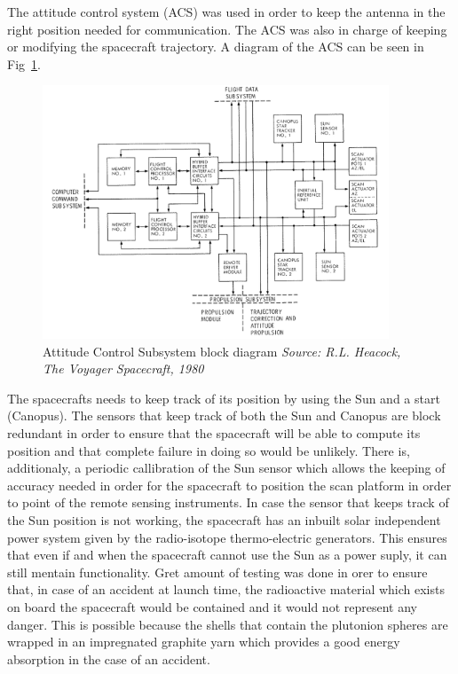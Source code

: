 The attitude control system (ACS) was used in order to keep
the antenna in the right position needed for communication. The ACS was also
in charge of keeping or modifying the spacecraft trajectory. A diagram of the
ACS can be seen in Fig~\ref{fig:voyager_bd}.

\begin{figure}[htb]
	\begin{center}
	\includegraphics[width=0.92\textwidth]{img/voyagerACS.png}
	\caption{Attitude Control Subsystem block diagram\small{\textit{ Source: R.L.
	Heacock, The Voyager Spacecraft, 1980}}}
	\label{fig:voyager_bd}
	\end{center}
\end{figure}

The spacecrafts needs to keep track of its position by using the Sun and a start
(Canopus). The sensors that keep track of both the Sun and Canopus are block
redundant in order to ensure that the spacecraft will be able to compute its
position and that complete failure in doing so would be unlikely. There is,
additionaly, a periodic callibration of the Sun sensor which allows the keeping
of accuracy needed in order for the spacecraft to position the scan platform in
order to point of the remote sensing instruments. In case the sensor that keeps
track of the Sun position is not working, the spacecraft has an inbuilt solar
independent power system given by the radio-isotope thermo-electric generators.
This ensures that even if and when the spacecraft cannot use the Sun as a power
suply, it can still mentain functionality. Gret amount of testing was done in
orer to ensure that, in case of an accident at launch time, the radioactive
material which exists on board the spacecraft would be contained and it would
not represent any danger. This is possible because the shells that contain the
plutonion spheres are wrapped in an impregnated graphite yarn which provides a
good energy absorption in the case of an accident.

